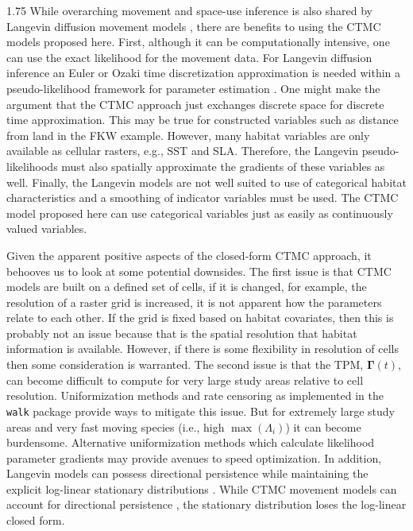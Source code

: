 \documentclass[12pt]{article}
\newcommand{\bG}{\ensuremath{\boldsymbol{\Gamma}}}
\begin{document}
\begin{spacing}{1.75}
While overarching movement and space-use inference is also shared by Langevin diffusion movement models \citep{michelot2018langevin, DupontEtAl2026a}, there are benefits to using the CTMC models proposed here. First, although it can be computationally intensive, one can use the exact likelihood for the movement data. For Langevin diffusion inference an Euler or Ozaki time discretization approximation is needed within a pseudo-likelihood framework for parameter estimation \citep{GloaguenEtAl2018a,michelot2018langevin}. One might make the argument that the CTMC approach just exchanges discrete space for discrete time approximation. This may be true for constructed variables such as distance from land in the FKW example. However, many habitat variables are only available as cellular rasters, e.g., SST and SLA. Therefore, the Langevin pseudo-likelihoods must also spatially approximate the gradients of these variables as well. Finally, the Langevin models are not well suited to use of categorical habitat characteristics \citep{michelot2018langevin} and a smoothing of indicator variables must be used. The CTMC model proposed here can use categorical variables just as easily as continuously valued variables.    

Given the apparent positive aspects of the closed-form CTMC approach, it behooves us to look at some potential downsides. The first issue is that CTMC models are built on a defined set of cells, if it is changed, for example, the resolution of a raster grid is increased, it is not apparent how the parameters relate to each other. If the grid is fixed based on habitat covariates, then this is probably not an issue because that is the spatial resolution that habitat information is available. However, if there is some flexibility in resolution of cells then some consideration is warranted.  The second issue is that the TPM, $\bG(t)$, can become difficult to compute for very large study areas relative to cell resolution. Uniformization methods \citep{sherlock2021direct} and rate censoring as implemented in the {\tt walk} package provide ways to mitigate this issue. But for extremely large study areas and very fast moving species (i.e., high $\max(\Lambda_i)$) it can become burdensome. Alternative uniformization methods which calculate likelihood parameter gradients \citep{RuppEtAl2024a} may provide avenues to speed optimization. In addition, Langevin models can possess directional persistence while maintaining the explicit log-linear stationary distributions \citep{DupontEtAl2026a}. While CTMC movement models can account for directional persistence \cite{Hanks:2015aa, Johnson353516}, the stationary distribution loses the log-linear closed form. 


\end{spacing}
\end{document}
